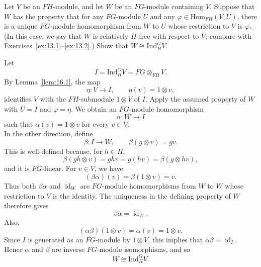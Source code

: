 \documentclass[../Odyssey_Project.tex]{subfiles}
\begin{document}
\begin{exercise}
\label{ex:16.1}
Let $V$ be an $FH$-module, and let $W$ be an $FG$-module containing $V$. Suppose that $W$ has the property that for any $FG$-module $U$ and any $\varphi \in \mathrm{Hom}_{FH}(V, U)$, there is a unique $FG$-module homomorphism from $W$ to $U$ whose restriction to $V$ is $\varphi$. (In this case, we say that $W$ is relatively $H$-free with respect to $V$; compare with Exercises~\ref{ex:13.1}--\ref{ex:13.2}.) Show that $W \cong \mathrm{Ind}_H^G V$.
\end{exercise}
\begin{solution}
    Let
    \[
        I=\mathrm{Ind}_H^G V=FG\otimes_{FH}V.
    \]
    By Lemma~\ref{lem:16.1}, the map
    \[
        \eta\colon V\to I,
        \qquad
        \eta(v)=1\otimes v,
    \]
    identifies $V$ with the $FH$-submodule $1\otimes V$ of $I$. Apply the assumed property of $W$ with $U=I$ and $\varphi=\eta$. We obtain an $FG$-module homomorphism
    \[
        \alpha\colon W\to I
    \]
    such that $\alpha(v)=1\otimes v$ for every $v\in V$.\\
    In the other direction, define
    \[
        \beta\colon I\to W,
        \qquad
        \beta(g\otimes v)=gv.
    \]
    This is well-defined because, for $h\in H$,
    \[
        \beta(gh\otimes v)=ghv=g(hv)=\beta(g\otimes hv),
    \]
    and it is $FG$-linear. For $v\in V$, we have
    \[
        (\beta\alpha)(v)=\beta(1\otimes v)=v.
    \]
    Thus both $\beta\alpha$ and $\operatorname{id}_W$ are $FG$-module homomorphisms from $W$ to $W$ whose restriction to $V$ is the identity. The uniqueness in the defining property of $W$ therefore gives
    \[
        \beta\alpha=\operatorname{id}_W.
    \]
    Also,
    \[
        (\alpha\beta)(1\otimes v)=\alpha(v)=1\otimes v.
    \]
    Since $I$ is generated as an $FG$-module by $1\otimes V$, this implies that $\alpha\beta=\operatorname{id}_I$. Hence $\alpha$ and $\beta$ are inverse $FG$-module isomorphisms, and so
    \[
        W\cong\mathrm{Ind}_H^G V.
    \]
\end{solution}
\end{document}
